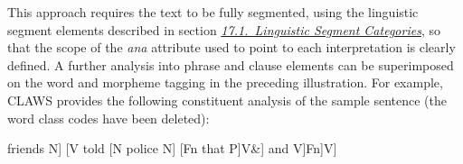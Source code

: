 This approach requires the text to be fully segmented, using the linguistic segment elements described in section \textit{\hyperref[AILC]{17.1.\ Linguistic Segment Categories}}, so that the scope of the {\itshape ana} attribute used to point to each interpretation is clearly defined. A further analysis into phrase and clause elements can be superimposed on the word and morpheme tagging in the preceding illustration. For example, CLAWS provides the following constituent analysis of the sample sentence (the word class codes have been deleted): \par\hfill\bgroup\exampleFont\vskip 10pt\begin{shaded}
\obeyspaces [N [G The victim's G] friends N] [V told [N police N] [Fn that \newline
[N Krueger N] [V [V\& drove [P into [N the quarry N]P]V\&] and V]Fn]V]\end{shaded}
\par\egroup 
\par
